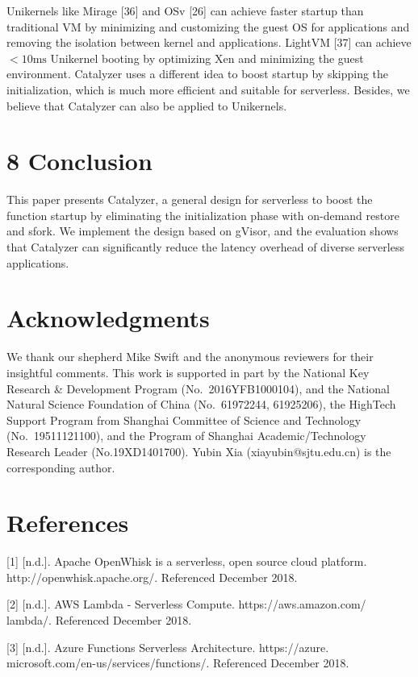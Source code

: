 \documentclass[
  10
]{article}
\begin{document}
Unikernels like Mirage {[}36{]} and OSv {[}26{]} can achieve faster
startup than traditional VM by minimizing and customizing the guest OS
for applications and removing the isolation between kernel and
applications. LightVM {[}37{]} can achieve \({ < } 1 0 \mathrm { m s }\)
Unikernel booting by optimizing Xen and minimizing the guest
environment. Catalyzer uses a different idea to boost startup by
skipping the initialization, which is much more efficient and suitable
for serverless. Besides, we believe that Catalyzer can also be applied
to Unikernels.

\section{8 Conclusion}\label{conclusion}

This paper presents Catalyzer, a general design for serverless to boost
the function startup by eliminating the initialization phase with
on-demand restore and sfork. We implement the design based on gVisor,
and the evaluation shows that Catalyzer can significantly reduce the
latency overhead of diverse serverless applications.

\section{Acknowledgments}\label{acknowledgments}

We thank our shepherd Mike Swift and the anonymous reviewers for their
insightful comments. This work is supported in part by the National Key
Research \& Development Program (No.~2016YFB1000104), and the National
Natural Science Foundation of China (No.~61972244, 61925206), the
HighTech Support Program from Shanghai Committee of Science and
Technology (No.~19511121100), and the Program of Shanghai
Academic/Technology Research Leader (No.19XD1401700). Yubin Xia
(xiayubin@sjtu.edu.cn) is the corresponding author.

\section{References}\label{references}

{[}1{]} {[}n.d.{]}. Apache OpenWhisk is a serverless, open source cloud
platform. http://openwhisk.apache.org/. Referenced December 2018.

{[}2{]} {[}n.d.{]}. AWS Lambda - Serverless Compute.
https://aws.amazon.com/ lambda/. Referenced December 2018.

{[}3{]} {[}n.d.{]}. Azure Functions Serverless Architecture.
https://azure. microsoft.com/en-us/services/functions/. Referenced
December 2018.
\end{document}
